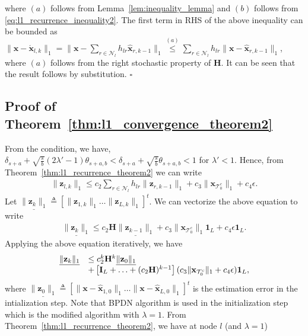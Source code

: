 \documentclass[journal]{IEEEtran}
\newcommand{\mbx}{\mathbf{x}}
\newcommand{\mbH}{\mathbf{H}}
\newcommand{\mbz}{\mathbf{z}}
\newcommand{\T}{\mathcal{T}}
\newcommand*{\QEDB}{\hfill\ensuremath{\square}}%
\begin{document}
where $(a)$ follows from Lemma~\ref{lem:inequality_lemma} and $(b)$ follows from \eqref{eq:l1_recurrence_inequality2}. The first term in RHS of the above inequality can be bounded as $\|\mbx  - \acute{\mbx}_{l,k}\|_1 = \|\mbx  - \sum\limits_{r \in \mathcal{N}_l} h_{lr} \hat{\mbx}_{r,k-1}\|_1 \stackrel{(a)}{\leq}  \sum\limits_{r \in \mathcal{N}_l} h_{lr} \|\mbx  - \hat{\mbx}_{r,k-1}\|_1$, where $(a)$ follows from the right stochastic property of $\mbH$. It can be seen that the result follows by substitution. \QEDB

\subsection{Proof of Theorem~\ref{thm:l1_convergence_theorem2}}
From the condition, we have, $\delta_{s+a}+\sqrt{\frac{s}{b}} (2\lambda'  -1)\theta_{s+a,b} < \delta_{s+a}+\sqrt{\frac{s}{b}}\theta_{s+a,b} < 1$ for $\lambda' < 1$. Hence, from Theorem~\ref{thm:l1_recurrence_theorem2} we can write
\begin{eqnarray*}
\|\mbz_{l,k}\|_1\leq c_2 \sum\limits_{r \in \mathcal{N}_l} h_{lr} \|\mbz_{r,k-1}\|_1+ c_3 \|\mbx_{\T_0^c}\|_1 + c_4 \epsilon.
\end{eqnarray*}
Let $\underline{\|\mbz_{k}\|_1} \triangleq \left[ \|\mbz_{1,k}\|_1 \hdots \|\mbz_{L,k}\|_1\right]^{t}$. We can vectorize the above equation to write
\begin{eqnarray*}
\underline{\|\mbz_{k}\|_1}\leq c_2 \mbH \underline{\|\mbz_{k-1}\|_1} + c_3 \|\mbx_{\T_0^c}\|_1 \mathbf{1}_L + c_4 \epsilon \mathbf{1}_L.
\end{eqnarray*}
Applying the above equation iteratively, we have
\begin{eqnarray}
\label{eq:l1_conv_thm_eq1}
\begin{array}{rl}
\underline{\|\mbz_{k}\|_1}& \leq c_2^k \mbH^k \underline{\|\mbz_{0}\|_1} \\ 
& \hspace{0mm}+ \left[ \mathbf{I}_L + \hdots + (c_2 \mbH)^{k-1}\right](c_3 \|\mbx_{\T_0^c}\|_1 + c_4 \epsilon )\mathbf{1}_L,
\end{array}
\end{eqnarray}
where $\underline{\|\mbz_{0}\|_1} \triangleq \left[ \|\mbx-\hat{\mbx}_{1,0}\|_1 \hdots \|\mbx-\hat{\mbx}_{L,0}\|_1\right]^{t}$ is the estimation error in the intialization step. Note that BPDN algorithm is used in the initialization step which is the modified algorithm with $\lambda = 1$. From Theorem~\ref{thm:l1_recurrence_theorem2}, we have at node $l$ (and $\lambda = 1$)
\end{document}
